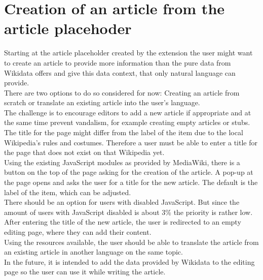 \section{Creation of an article from the article placehoder}
Starting at the article placeholder created by the extension the user might want to create an article to provide more information than the pure data from Wikidata offers and give this data context, that only natural language can provide. \\
There are two options to do so considered for now: Creating an article from scratch or translate an existing article into the user's language. \\
The challenge is to encourage editors to add a new article if appropriate and at the same time prevent vandalism, for example creating empty articles or stubs.\\ 
The title for the page might differ from the label of the item due to the local Wikipedia's rules and costumes. Therefore a user must be able to enter a title for the page that does not exist on that Wikipedia yet. \\
Using the existing JavaScript modules as provided by MediaWiki, there is a button on the top of the page asking for the creation of the article. A pop-up at the page opens and asks the user for a title for the new article. The default is the label of the item, which can be adjusted. \\
There should be an option for users with disabled JavaScript. But since the amount of users with JavaScript disabled is about 3\% %
the priority is rather low. \\
After entering the title of the new article, the user is redirected to an empty editing page, where they can add their content. \\
Using the resources  available, the user should be able to translate the article from an existing article in another language on the same topic. \\
In the future, it is intended to add the data provided by Wikidata to the editing page so the user can use it while writing the article. 

